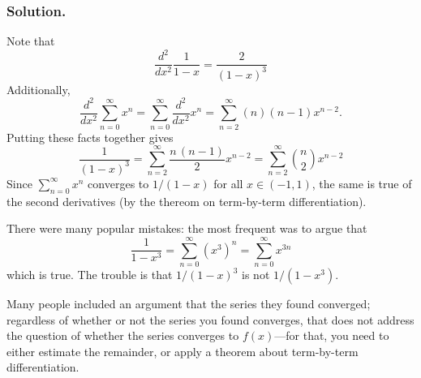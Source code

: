 \documentclass[12pt]{article}
\newenvironment{solution}{\subsubsection*{Solution.}}{}
\begin{document}
\begin{solution}\begin{solutiontext}

Note that
$$
\frac{d^2}{dx^2} \frac{1}{1-x} = \frac{2}{(1-x)^3}
$$
Additionally,
$$
\frac{d^2}{dx^2} \sum_{n=0}^\infty x^n = 
\sum_{n=0}^\infty \frac{d^2}{dx^2} x^n = 
\sum_{n=2}^\infty (n)(n-1) x^{n-2}.
$$
Putting these facts together gives
$$
\frac{1}{(1-x)^3} = \sum_{n=2}^\infty \frac{n \, (n-1)}{2} x^{n-2} = \sum_{n=2}^\infty \binom{n}{2} x^{n-2}
$$
Since $\sum_{n=0}^\infty x^n$ converges to $1/(1-x)$ for all $x \in
(-1,1)$, the same is true of the second derivatives (by the thereom on
term-by-term differentiation).

There were many popular mistakes: the most frequent was to argue that
$$
\frac{1}{1-x^3} = \sum_{n=0}^\infty (x^3)^n = \sum_{n=0}^\infty x^{3n}
$$
which is true.  The trouble is that $1/(1-x)^3$ is not $1/(1-x^3)$.

    Many people included an argument that the series they found
    converged; regardless of whether or not the series you found
    converges, that does not address the question of whether the
    series converges to $f(x)$---for that, you need to either estimate
    the remainder, or apply a theorem about term-by-term
    differentiation.

\end{solutiontext}\end{solution}
\end{document}
